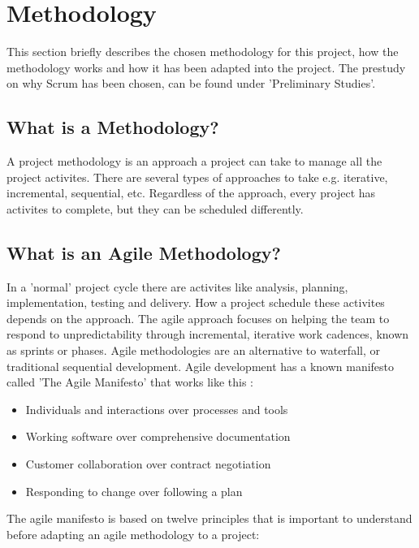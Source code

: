 \section{Methodology}

This section briefly describes the chosen methodology for this project, how the methodology works and how it has been adapted into the project. The prestudy on why Scrum has been chosen, can be found under 'Preliminary Studies'. 

\subsection*{What is a Methodology?}

A project methodology is an approach a project can take to manage all the project activites. There are several types of approaches to take e.g. iterative, incremental, sequential, etc. Regardless of the approach, every project has activites to complete, but they can be scheduled differently. \cite{methodology}

\subsection*{What is an Agile Methodology?}

In a 'normal' project cycle there are activites like analysis, planning, implementation, testing and delivery. How a project schedule these activites depends on the approach. 
The agile approach focuses on helping the team to respond to unpredictability through incremental, iterative work cadences, known as sprints or phases. Agile methodologies are an alternative to waterfall, or traditional sequential development. 
Agile development has a known manifesto called 'The Agile Manifesto' that works like this \cite{agileMethodology}: 

\begin{itemize}
	\item Individuals and interactions over processes and tools
    \item Working software over comprehensive documentation
    \item Customer collaboration over contract negotiation
    \item Responding to change over following a plan 
\end{itemize}

The agile manifesto is based on twelve principles that is important to understand before
adapting an agile methodology to a project:\cite{agileMethodology}

